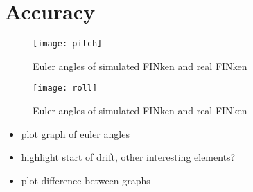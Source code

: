 \section{Accuracy}
\begin{figure}
\begin{center}
\texttt{[image: pitch]}
\caption{Euler angles of simulated FINken and real FINken}
\label{pic:pitchResponse}
\end{center}
\end{figure}
\begin{figure}
\begin{center}
\texttt{[image: roll]}
\caption{Euler angles of simulated FINken and real FINken}
\label{pic:rollResponse}
\end{center}
\end{figure}
\begin{itemize}
\item{plot graph of euler angles}
\item{highlight start of drift, other interesting elements?}
\item{plot difference between graphs}
\end{itemize}

